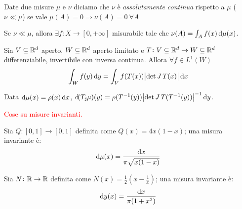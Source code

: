 \begin{definition}
    Date due misure $ \mu $ e $ \nu $ diciamo che $ \nu $ è \emph{assolutamente continua} rispetto a $ \mu $ ($ \nu \ll \mu $) se vale $ \mu(A) = 0 \Rightarrow \nu(A) = 0\ \forall A $
\end{definition}
\begin{thm}
    Se $ \nu \ll \mu $, allora $ \exists f\colon X\to [0,+\infty] $ misurabile tale che $ \nu(A) = \int_A f(x)\dif\mu(x) $.
\end{thm}

\begin{thm}
    Sia $ V \subseteq\mathbb{R}^d $ aperto, $ W\subseteq\mathbb{R}^d $ aperto limitato e $ T\colon V\subseteq \mathbb{R}^d \to W \subseteq \mathbb{R}^d $ differenziabile, invertibile con inversa continua. Allora $ \forall f\in L^1(W) $
    \[ \int_W f(y)\dif y = \int_V f(T(x)) \abs{\det{\jac{T}(x)}} \dif x \]
\end{thm}
\begin{oss}
    Data $ \dif\mu(x) = \rho(x)\dif x $, $ \dif(T_\sharp\mu)(y) = \rho(T^{-1}(y)) \abs{\det{\jac T}(T^{-1}(y))}^{-1} \dif y $.
\end{oss}

\textcolor{red}{Cose su misure invarianti.}

\begin{exercise}
    Sia $ Q\colon [0,1] \to [0,1] $ definita come $ Q(x) = 4x(1-x) $; una misura invariante è:
    \[ \dif\mu(x) = \frac{\dif x}{\pi\sqrt{x(1-x)}} \]
\end{exercise}
\begin{exercise}
    Sia $ N\colon \mathbb{R}\to\mathbb{R} $ definita come $ N(x) = \frac{1}{2} \left( x-\frac{1}{x} \right) $; una misura invariante è:
    \[ \dif y(x) = \frac{\dif x}{\pi(1+x^2)} \]
\end{exercise}
